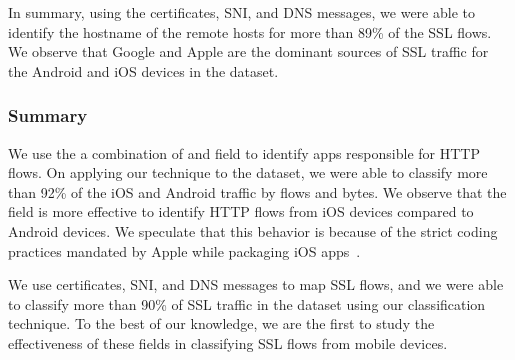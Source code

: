 In summary, using the certificates, SNI, and DNS messages, we were able to identify the hostname of the remote hosts for more than 89\% of the SSL flows.
We observe that Google and Apple are the dominant sources of SSL traffic for the Android and iOS devices in the \mobWild dataset.

\subsubsection{Summary}

We use the a combination of \useragent and \httphost field to identify apps responsible for HTTP flows.
On applying our technique to the \mobWild dataset, we were able to classify more than 92\% of the iOS and Android traffic by flows and bytes. 
We observe that the \useragent field is more effective to identify HTTP flows from iOS devices compared to Android devices.
We speculate that this behavior is because of the strict coding practices mandated by Apple while packaging iOS apps~\cite{xcode:distrib}.

We use certificates, SNI, and DNS messages to map SSL flows, and we were able to classify more than 90\% of SSL traffic in the \mobWild dataset using our classification technique. 
To the best of our knowledge, we are the first to study the effectiveness of these fields in classifying SSL flows from mobile devices.



